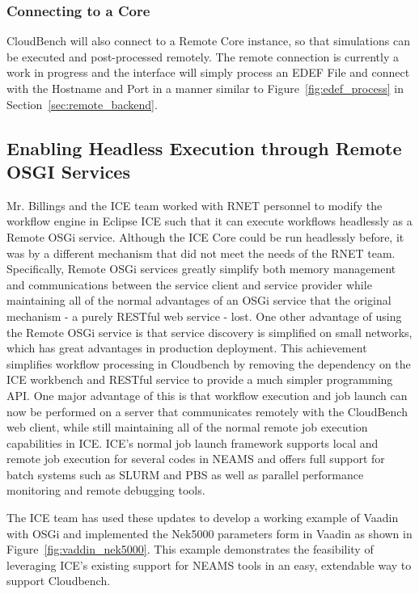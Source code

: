 \subsubsection{Connecting to a Core}
CloudBench will also connect to a Remote Core instance, so that simulations can 
be executed and post-processed remotely. The remote connection is currently a 
work in progress and the interface will simply process an EDEF File and connect 
with the Hostname and Port in a manner similar to Figure~\ref{fig:edef_process} 
in Section~\ref{sec:remote_backend}.


\subsection{Enabling Headless Execution through Remote OSGI Services}
\label{sec:remote_exec}

Mr. Billings and the ICE team worked with RNET personnel to modify the workflow 
engine in Eclipse ICE such that it can execute workflows headlessly as a Remote 
OSGi service. Although the ICE Core could be run headlessly before, it was by a 
different mechanism that did not meet the needs of the RNET team. Specifically, 
Remote OSGi services greatly simplify both memory management and communications 
between the service client and service provider while maintaining all of the 
normal advantages of an OSGi service that the original mechanism - a purely 
RESTful web service - lost. One other advantage of using the Remote OSGi 
service is that service discovery is simplified on small networks, which has 
great advantages in production deployment. This achievement simplifies workflow 
processing in Cloudbench by removing the dependency on the ICE workbench and 
RESTful service to provide a much simpler programming API. One major advantage 
of this is that workflow execution and job launch can now be performed on a 
server that communicates remotely with the CloudBench web client, while still 
maintaining all of the normal remote job execution capabilities in ICE. ICE's 
normal job launch framework supports local and remote job execution for several 
codes in NEAMS and offers full support for batch systems such as SLURM and PBS 
as well as parallel performance monitoring and remote debugging tools.

The ICE team has used these updates to develop a working example of Vaadin with 
OSGi and implemented the Nek5000 parameters form in Vaadin as shown in 
Figure~\ref{fig:vaddin_nek5000}. This example demonstrates the feasibility of 
leveraging ICE's existing support for NEAMS tools in an easy, extendable way to 
support Cloudbench.

